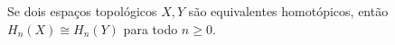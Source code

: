 \begin{corol}
    Se dois espaços topológicos $X,Y$ são equivalentes homotópicos, então $H_n(X)\cong H_n (Y)$ para todo $n\ge 0$. 
\end{corol}

